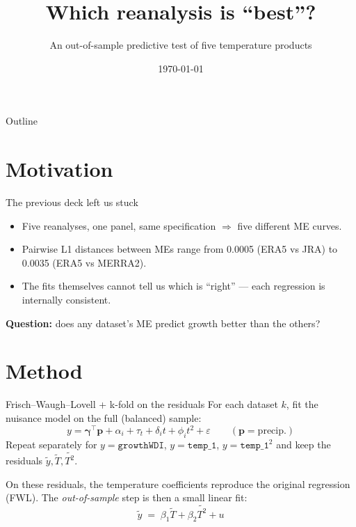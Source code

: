 \documentclass[10pt,aspectratio=169]{beamer}
\title{Which reanalysis is ``best''?}
\subtitle{An out-of-sample predictive test of five temperature products}
\author{}
\date{\today}
\begin{document}
\begin{frame}
  \titlepage
\end{frame}

\begin{frame}{Outline}
  \tableofcontents
\end{frame}

\section{Motivation}

\begin{frame}{The previous deck left us stuck}
  \begin{itemize}
    \item Five reanalyses, one panel, same specification $\Rightarrow$ five
          different ME curves.
    \item Pairwise L1 distances between MEs range from 0.0005 (ERA5 vs JRA)
          to 0.0035 (ERA5 vs MERRA2).
    \item The fits themselves cannot tell us which is ``right'' --- each
          regression is internally consistent.
  \end{itemize}
  \vspace{0.5em}
  \textbf{Question:} does any dataset's ME predict growth better than the others?
\end{frame}

\section{Method}

\begin{frame}{Frisch--Waugh--Lovell + k-fold on the residuals}
  For each dataset $k$, fit the nuisance model on the full (balanced) sample:
  \[
    y = \boldsymbol\gamma^\top \mathbf{p} + \alpha_i + \tau_t
      + \delta_i t + \phi_i t^2 + \varepsilon \qquad(\mathbf{p} = \text{precip.})
  \]
  Repeat separately for $y = \texttt{growthWDI}$, $y = \texttt{temp\_1}$,
  $y = \texttt{temp\_1}^2$ and keep the residuals $\tilde y, \tilde T, \tilde{T^2}$.

  \vspace{0.4em}
  On these residuals, the temperature coefficients reproduce the original
  regression (FWL). The \emph{out-of-sample} step is then a small linear fit:
  \[
    \tilde y \;=\; \beta_1 \tilde T + \beta_2 \tilde{T^2} + u
  \]
\end{frame}
\end{document}
